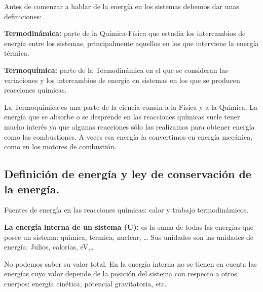 \documentclass[
  spanish,
]{article}
\begin{document}
Antes de comenzar a hablar de la energía en los sistemas debemos dar
unas definiciones:

\textbf{Termodinámica:} parte de la Química-Física que estudia los
intercambios de energía entre los sistemas, principalmente aquellos en
los que interviene la energía térmica.

\textbf{Termoquímica:} parte de la Termodinámica en el que se consideran
las variaciones y los intercambios de energía en sistemas en los que se
producen reacciones químicas.

La Termoquímica es una parte de la ciencia común a la Física y a la
Química. La energía que se absorbe o se desprende en las reacciones
químicas suele tener mucho interés ya que algunas reacciones sólo las
realizamos para obtener energía como las combustiones. A veces esa
energía la convertimos en energía mecánica, como en los motores de
combustión.

\hypertarget{definiciuxf3n-de-energuxeda-y-ley-de-conservaciuxf3n-de-la-energuxeda.}{%
\subsection{Definición de energía y ley de conservación de la
energía.}\label{definiciuxf3n-de-energuxeda-y-ley-de-conservaciuxf3n-de-la-energuxeda.}}

Fuentes de energía en las reacciones químicas: calor y trabajo
termodinámicos.

\textbf{La energía interna de un sistema (U):} es la suma de todas las
energías que posee un sistema: química, térmica, nuclear, \ldots{} Sus
unidades son las unidades de energía: Julios, calorías, eV,\ldots{}

No podemos saber su valor total. En la energía interna no se tienen en
cuenta las energías cuyo valor depende de la posición del sistema con
respecto a otros cuerpos: energía cinética, potencial gravitatoria, etc.

\hfill{}
\end{document}
